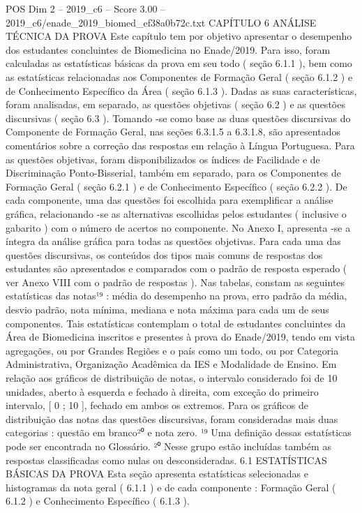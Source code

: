 \begin{textsample}{POS Dim 2 – 2019\_c6 – Score 3.00 – 2019\_c6/enade\_2019\_biomed\_ef38a0b72c.txt}  \label{ex:f2_pos_159}
CAPÍTULO 6 ANÁLISE TÉCNICA DA PROVA Este capítulo tem por objetivo apresentar o desempenho dos estudantes concluintes de Biomedicina no Enade/2019.
Para isso, foram calculadas as estatísticas básicas da prova em seu todo ( seção 6.1.1 ), bem como as estatísticas relacionadas aos Componentes de Formação Geral ( seção 6.1.2 ) e de Conhecimento Específico da Área ( seção 6.1.3 ).
Dadas as suas características, foram analisadas, em separado, as questões objetivas ( seção 6.2 ) e as questões discursivas ( seção 6.3 ).
Tomando -se como base as duas questões discursivas do Componente de Formação Geral, nas seções 6.3.1.5 a 6.3.1.8, são apresentados comentários sobre a correção das respostas em relação à Língua Portuguesa.
Para as questões objetivas, foram disponibilizados os índices de Facilidade e de Discriminação Ponto-Bisserial, também em separado, para os Componentes de Formação Geral ( seção 6.2.1 ) e de Conhecimento Específico ( seção 6.2.2 ).
De cada componente, uma das questões foi escolhida para exemplificar a análise gráfica, relacionando -se as alternativas escolhidas pelos estudantes ( inclusive o gabarito ) com o número de acertos no componente.
No Anexo I, apresenta -se a íntegra da análise gráfica para todas as questões objetivas.
Para cada uma das questões discursivas, os conteúdos dos tipos mais comuns de respostas dos estudantes são apresentados e comparados com o padrão de resposta esperado ( ver Anexo VIII com o padrão de respostas ).
Nas tabelas, constam as seguintes estatísticas das notas¹⁹ : média do desempenho na prova, erro padrão da média, desvio padrão, nota mínima, mediana e nota máxima para cada um de seus componentes.
Tais estatísticas contemplam o total de estudantes concluintes da Área de Biomedicina inscritos e presentes à prova do Enade/2019, tendo em vista agregações, ou por Grandes Regiões e o país como um todo, ou por Categoria Administrativa, Organização Acadêmica da IES e Modalidade de Ensino.
Em relação aos gráficos de distribuição de notas, o intervalo considerado foi de 10 unidades, aberto à esquerda e fechado à direita, com exceção do primeiro intervalo, [ 0 ; 10 ], fechado em ambos os extremos.
Para os gráficos de distribuição das notas das questões discursivas, foram consideradas mais duas categorias : questão em branco²⁰ e nota zero. ¹⁹ Uma definição dessas estatísticas pode ser encontrada no Glossário. ²⁰ Nesse grupo estão incluídas também as respostas classificadas como nulas ou desconsideradas. 6.1 ESTATÍSTICAS BÁSICAS DA PROVA Esta seção apresenta estatísticas selecionadas e histogramas da nota geral ( 6.1.1 ) e de cada componente : Formação Geral ( 6.1.2 ) e Conhecimento Específico ( 6.1.3 ).

\end{textsample}
